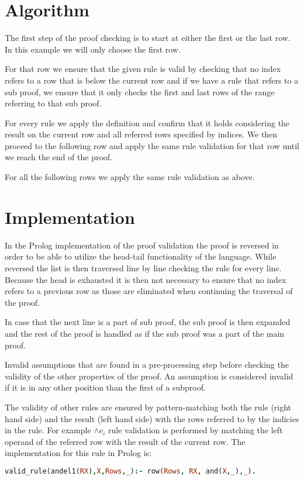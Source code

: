 \documentclass[a4paper,11pt]{article}
\begin{document}
\section{Algorithm}
The first step of the proof checking is to start at either the first or the last row. In this example we will only choose the first row.

For that row we ensure that the given rule is valid by checking that no index refers to a row that is below the current row and if we have a rule that refers to a sub proof, we ensure that it only checks the first and last rows of the range referring to that sub proof.

For every rule we apply the definition and confirm that it holds considering the result on the current row and all referred rows specified by indices. We then proceed to the following row and apply the same rule validation for that row until we reach the end of the proof.

For all the following rows we apply the same rule validation as above.
\section{Implementation}
In the Prolog implementation of the proof validation the proof is reversed in order to be able to utilize the head-tail functionality of the language. While reversed the list is then traversed line by line checking the rule for every line. Because the head is exhausted it is then not necessary to ensure that no index refers to a previous row as those are eliminated when continuing the traversal of the proof.

In case that the next line is a part of sub proof, the sub proof is then expanded and the rest of the proof is handled as if the sub proof was a part of the main proof.

Invalid assumptions that are found in a pre-processing step before checking the validity of the other properties of the proof. An assumption is considered invalid if it is in any other position than the first of a subproof.

The validity of other rules are ensured by pattern-matching both the rule (right hand side) and the result (left hand side) with the rows referred to by the indicies in the rule. For example $\land e_i$ rule validation is performed by matching the left operand of the referred row with the result of the current row.
\newpage
The implementation for this rule in Prolog is:

\begin{lstlisting}[frame=single,language=Prolog]
%signature: valid_rule(Rule,Result,Rows,Premises).
valid_rule(andel1(RX),X,Rows,_):- row(Rows, RX, and(X,_),_).
\end{lstlisting}
\end{document}
